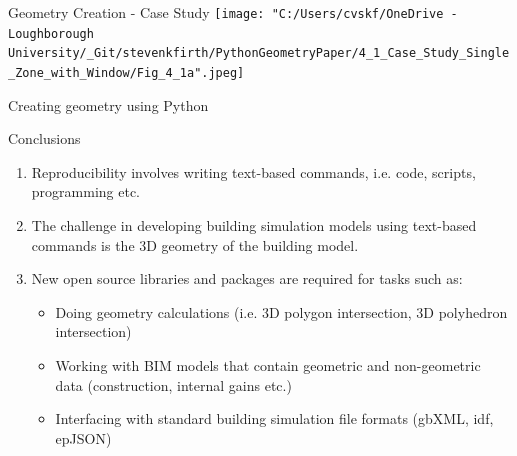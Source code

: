\documentclass{beamer}
\begin{document}
	\begin{frame}{Geometry Creation - Case Study}
		\texttt{[image: "C:/Users/cvskf/OneDrive - Loughborough University/\_Git/stevenkfirth/PythonGeometryPaper/4\_1\_Case\_Study\_Single\_Zone\_with\_Window/Fig\_4\_1a".jpeg]}
	\end{frame}

	\begin{frame}{Creating geometry using Python}
		\footnotesize
		
	\end{frame}

	\begin{frame}{Conclusions}
		\begin{enumerate}
			\item Reproducibility involves writing text-based commands, i.e. code, scripts, programming etc.
			\item The challenge in developing building simulation models using text-based commands is the 3D geometry of the building model.
			\item New open source libraries and packages are required for tasks such as:
			\begin{itemize}
				\item Doing geometry calculations (i.e. 3D polygon intersection, 3D polyhedron intersection)
				\item Working with BIM models that contain geometric and non-geometric data (construction, internal gains etc.)
				\item Interfacing with standard building simulation file formats (gbXML, idf, epJSON)
			\end{itemize} 
		\end{enumerate}
	\end{frame}

	
\end{document}

